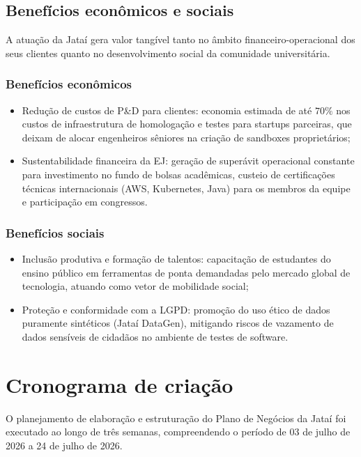 \documentclass[
  12pt,
  openright,
  oneside,
  a4paper,
  brazilian
]{abntex2}
\begin{document}
\section{Benefícios econômicos e sociais}
\label{sec:beneficios_economicos_sociais}

A atuação da Jataí gera valor tangível tanto no âmbito financeiro-operacional dos seus clientes quanto no desenvolvimento social da comunidade universitária.

\subsection{Benefícios econômicos}
\begin{itemize}
    \item{Redução de custos de P\&D para clientes:} economia estimada de até $70\%$ nos custos de infraestrutura de homologação e testes para startups parceiras, que deixam de alocar engenheiros sêniores na criação de sandboxes proprietários;
    \item{Sustentabilidade financeira da EJ:} geração de superávit operacional constante para investimento no fundo de bolsas acadêmicas, custeio de certificações técnicas internacionais (AWS, Kubernetes, Java) para os membros da equipe e participação em congressos.
\end{itemize}

\subsection{Benefícios sociais}
\begin{itemize}
    \item{Inclusão produtiva e formação de talentos:} capacitação de estudantes do ensino público em ferramentas de ponta demandadas pelo mercado global de tecnologia, atuando como vetor de mobilidade social;
    \item{Proteção e conformidade com a LGPD:} promoção do uso ético de dados puramente sintéticos (Jataí DataGen), mitigando riscos de vazamento de dados sensíveis de cidadãos no ambiente de testes de software.
\end{itemize}

\chapter{Cronograma de criação}
\label{cap:cronograma_criacao}

O planejamento de elaboração e estruturação do Plano de Negócios da Jataí foi executado ao longo de três semanas, compreendendo o período de 03 de julho de 2026 a 24 de julho de 2026.
\end{document}
